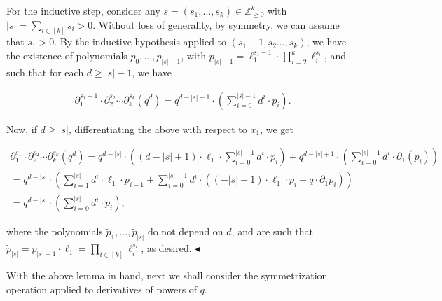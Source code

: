 For the inductive step, consider any $s=(s_{1},\dots,s_{k})\in\mathbb{Z}_{\geqslant 0}^{k}$ with $\left|s\right|=\sum_{i\in[k]}s_{i}>0$.
Without loss of generality, by symmetry, we can assume that $s_{1}>0$.
By the inductive hypothesis applied to $(s_{1}-1,s_{2}\dots,s_{k})$, we have the existence of polynomials $p_{0},\dots,p_{\left|s\right|-1}$, with $p_{\left|s\right|-1}=\ell_{1}^{s_{1}-1}\cdot\prod_{i=2}^{k}\ell_{i}^{s_{i}}$, and such that for each $d\geqslant\left|s\right|-1$, we have\par


\[\begin{gathered}
\partial_{1}^{s_{1}-1}\cdot\partial_{2}^{s_{2}}\cdots\partial_{k}^{s_{k}}\left(q^{d}\right)=q^{d-\left|s\right|+1}\cdot\left(\sum_{i=0}^{\left|s\right|-1}d^{i}\cdot p_{i}\right).
\end{gathered}\]


Now, if $d\geqslant\left|s\right|$, differentiating the above with respect to $x_{1}$, we get\par




\[\begin{gathered}
\displaystyle\partial_{1}^{s_{1}}\cdot\partial_{2}^{s_{2}}\cdots\partial_{k}^{s_{k}}\left(q^{d}\right) \displaystyle=q^{d-\left|s\right|}\cdot\left((d-\left|s\right|+1)\cdot\ell_{1}\cdot\sum_{i=0}^{\left|s\right|-1}d^{i}\cdot p_{i}\right)+q^{d-\left|s\right|+1}\cdot\left(\sum_{i=0}^{\left|s\right|-1}d^{i}\cdot\partial_{1}(p_{i})\right) \\
\displaystyle=q^{d-\left|s\right|}\cdot\left(\sum_{i=1}^{\left|s\right|}d^{i}\cdot\ell_{1}\cdot p_{i-1}+\sum_{i=0}^{\left|s\right|-1}d^{i}\cdot\left(\left(-\left|s\right|+1\right)\cdot\ell_{1}\cdot p_{i}+q\cdot\partial_{1}p_{i}\right)\right) \\
\displaystyle=q^{d-\left|s\right|}\cdot\left(\sum_{i=0}^{\left|s\right|}d^{i}\cdot\tilde{p}_{i}\right),
\end{gathered}\]


where the polynomials $\tilde{p}_{1},\dots,\tilde{p}_{\left|s\right|}$ do not depend on $d$, and are such that $\tilde{p}_{\left|s\right|}=p_{\left|s\right|-1}\cdot\ell_{1}=\prod_{i\in[k]}\ell_{i}^{s_{i}}$, as desired.
$\blacktriangleleft$\par




With the above lemma in hand, next we shall consider the symmetrization operation applied to derivatives of powers of $q$.\par



